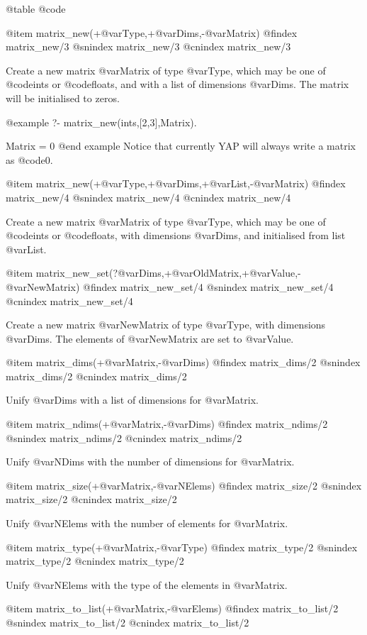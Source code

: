 {{{{{{{{@table @code

@item matrix_new(+@var{Type},+@var{Dims},-@var{Matrix})
@findex matrix_new/3
@snindex matrix_new/3
@cnindex matrix_new/3

Create a new matrix @var{Matrix} of type @var{Type}, which may be one of
@code{ints} or @code{floats}, and with a list of dimensions @var{Dims}.
The matrix will be initialised to zeros.

@example
?- matrix_new(ints,[2,3],Matrix).

Matrix = 0
@end example
Notice that currently YAP will always write a matrix as @code{0}.

@item matrix_new(+@var{Type},+@var{Dims},+@var{List},-@var{Matrix})
@findex matrix_new/4
@snindex matrix_new/4
@cnindex matrix_new/4

Create a new matrix @var{Matrix} of type @var{Type}, which may be one of
@code{ints} or @code{floats}, with dimensions @var{Dims}, and
initialised from list @var{List}.

@item matrix_new_set(?@var{Dims},+@var{OldMatrix},+@var{Value},-@var{NewMatrix})
@findex matrix_new_set/4
@snindex matrix_new_set/4
@cnindex matrix_new_set/4

Create a new matrix @var{NewMatrix} of type @var{Type}, with dimensions
@var{Dims}. The elements of @var{NewMatrix} are set to @var{Value}.

@item matrix_dims(+@var{Matrix},-@var{Dims})
@findex matrix_dims/2
@snindex matrix_dims/2
@cnindex matrix_dims/2

Unify @var{Dims} with a list of dimensions for @var{Matrix}.

@item matrix_ndims(+@var{Matrix},-@var{Dims})
@findex matrix_ndims/2
@snindex matrix_ndims/2
@cnindex matrix_ndims/2

Unify @var{NDims} with the number of dimensions for @var{Matrix}.

@item matrix_size(+@var{Matrix},-@var{NElems})
@findex matrix_size/2
@snindex matrix_size/2
@cnindex matrix_size/2

Unify @var{NElems} with the number of elements for @var{Matrix}.

@item matrix_type(+@var{Matrix},-@var{Type})
@findex matrix_type/2
@snindex matrix_type/2
@cnindex matrix_type/2

Unify @var{NElems} with the type of the elements in @var{Matrix}.

@item matrix_to_list(+@var{Matrix},-@var{Elems})
@findex matrix_to_list/2
@snindex matrix_to_list/2
@cnindex matrix_to_list/2

}}}}}}}}
